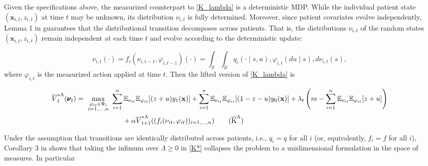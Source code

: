 \documentclass[12pt,a4paper]{article}
\newcommand{\bnu}{\pmb{\nu}}
\newcommand{\bx}{\mathbf{x}}
\newcommand{\oV}{\overline{V}}
\begin{document}
Given the specifications above, the measurized counterpart to \eqref{K_lambda} is a deterministic MDP. While the individual patient state $(\bx_{i,t}, z_{i,t})$ at time $t$ may be unknown, its distribution $\nu_{i,t}$ is fully determined. Moreover, since patient covariates evolve independently, Lemma 1 in \cite{measurizedWMDP} guarantees that the distributional transition decomposes across patients. That is, the distributions $\nu_{i,t}$ of the random states $(\bx_{i,t}, z_{i,t})$ remain independent at each time $t$ and evolve according to the deterministic update:

\begin{equation}\label{fi}\tag{f$_i$}
\nu_{i,t}(\cdot) = f_i(\nu_{i,t-1}, \varphi_{i,t-1})(\cdot) = \int_{\mathcal{S}} \int_{\mathcal{U}} q_i(\cdot \mid s, u) , \varphi_{i,t}(du \mid s) , d\nu_{i,t}(s),
\end{equation}
where $\varphi_{i,t}$ is the measurized action applied at time $t$. Then the lifted version of \eqref{K_lambda} is

	\begin{align}
		\oV^{*\Lambda}_t(\bnu_t)= \ \max_{\substack{\varphi_{it} \in \Phi_i\\ i=1,...,n}} & \ \sum_{i=1}^n \mathbb{E}_{\nu_{it}}\mathbb{E}_{\varphi_{it}} [(z+u) y_1(\bx)] 
        +\sum_{i=1}^n \mathbb{E}_{\nu_{it}}\mathbb{E}_{\varphi_{it}} [(1-z-u) y_0(\bx)] 
        +\lambda_t\left(m- \sum_{i=1}^n \mathbb{E}_{\nu_{it}}\mathbb{E}_{\varphi_{it}} [z+u]\right) \nonumber\\
        & \qquad + \alpha \oV^{*\Lambda}_{t+1}((f_i(\nu_{it},\varphi_{it}))_{i=1,...,n}) \label{K*}\tag{$\overline{\mbox{K}}^\Lambda$}
	\end{align}



Under the assumption that transitions are identically distributed across patients, i.e., $q_i = q$ for all $i$ (or, equivalently, $f_i=f$ for all $i$), Corollary 3 in \cite{measurizedWMDP} shows that taking the infimum over $\Lambda \geq 0$ in \eqref{K*} collapses the problem to a unidimensional formulation in the space of measures. In particular
\end{document}
